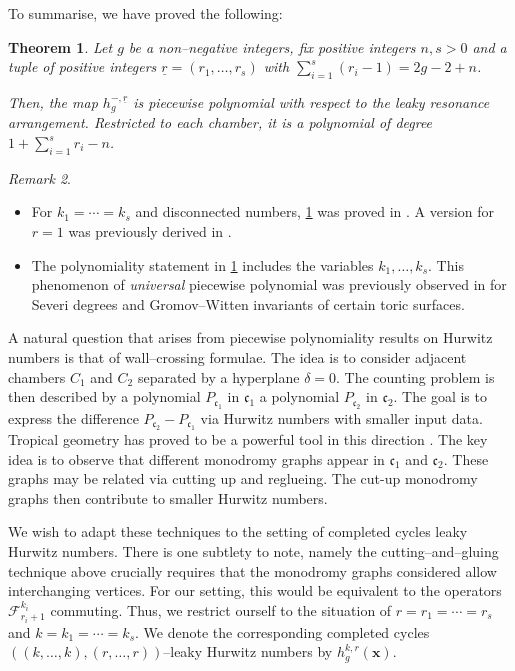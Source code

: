 \documentclass[10pt,a4paper,oneside,no-math,reqno]{amsart}%
\theoremstyle{plain}
\newtheorem{theorem}{Theorem}[section]
\theoremstyle{definition}
\theoremstyle{remark}
\newtheorem{remark}[theorem]{Remark}
\numberwithin{equation}{section}
\newcommand{\1}{\mathds{1}}
\newcommand{\<}{\langle}
\renewcommand{\>}{\rangle}
\begin{document}
To summarise, we have proved the following:

\begin{theorem}
\label{thm-piecepoly}
    Let $g$ be a non--negative integers, fix positive integers $n,s>0$ and a tuple of positive integers $\underline{r}=(r_1,\dots,r_s)$ with $\sum_{i=1}^s (r_i - 1) = 2g-2+n$.
    
    Then, the map $h_g^{-,\underline{r}}$ is piecewise polynomial with respect to the leaky resonance arrangement. Restricted to each chamber, it is a polynomial of degree $1+\sum_{i=1}^s r_i -n$.
\end{theorem}

\begin{remark}
\begin{itemize}
    \item For $k_1=\cdots=k_s$ and disconnected numbers, \cref{thm-piecepoly} was proved in \cite{AKL25}. A version for $r=1$ was previously derived in \cite{CMR25}.
    \item The polynomiality statement in \cref{thm-piecepoly} includes the variables $k_1,\dots,k_s$. This phenomenon of \emph{universal} piecewise polynomial was previously observed in \cite{ardila2012universal,AB17} for Severi degrees and Gromov--Witten invariants of certain toric surfaces.
\end{itemize}

\end{remark}
 

A natural question that arises from piecewise polynomiality results on Hurwitz numbers is that of wall--crossing formulae. The idea is to consider adjacent chambers $C_1$ and $C_2$ separated by a hyperplane $\delta=0$. The counting problem is then described by a polynomial $P_{\mathfrak{c}_1}$ in $\mathfrak{c}_1$ a polynomial $P_{\mathfrak{c}_2}$ in $\mathfrak{c}_2$. The goal is to express the difference $P_{\mathfrak{c}_2}-P_{\mathfrak{c}_1}$ via Hurwitz numbers with smaller input data. Tropical geometry has proved to be a powerful tool in this direction \cite{CJM11,HL20}. The key idea is to observe that different monodromy graphs appear in $\mathfrak{c}_1$ and $\mathfrak{c}_2$. These graphs may be related via cutting up and reglueing. The cut-up monodromy graphs then contribute to smaller Hurwitz numbers.

We wish to adapt these techniques to the setting of completed cycles leaky Hurwitz numbers. There is one subtlety to note, namely the cutting--and--gluing technique above crucially requires that the monodromy graphs considered allow interchanging vertices. For our setting, this would be equivalent to the operators $\mathcal{F}_{r_i+1}^{k_i}$ commuting. Thus, we restrict ourself to the situation of $r=r_1=\cdots=r_s$ and $k=k_1=\cdots=k_s$. We denote the corresponding completed cycles $((k,\dots,k),(r,\dots,r))$--leaky Hurwitz numbers by $h_g^{k,r}(\mathbf{x})$.
\end{document}
